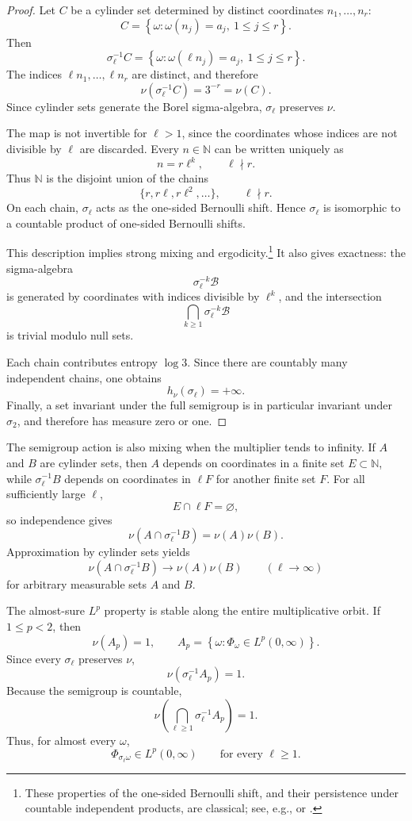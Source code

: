 \documentclass[11pt]{article}
\theoremstyle{remark}
\begin{document}
\begin{proof}
Let \(C\) be a cylinder set determined by distinct coordinates
\(n_1,\dots,n_r\):
\[
C=
\left\{
\omega:
\omega(n_j)=a_j,\ 1\leq j\leq r
\right\}.
\]
Then
\[
\sigma_\ell^{-1}C
=
\left\{
\omega:
\omega(\ell n_j)=a_j,\ 1\leq j\leq r
\right\}.
\]
The indices \(\ell n_1,\dots,\ell n_r\) are distinct, and therefore
\[
\nu(\sigma_\ell^{-1}C)=3^{-r}=\nu(C).
\]
Since cylinder sets generate the Borel sigma-algebra,
\(\sigma_\ell\) preserves \(\nu\).

The map is not invertible for \(\ell>1\), since the coordinates whose
indices are not divisible by \(\ell\) are discarded.  Every
\(n\in\mathbb N\) can be written uniquely as
\[
n=r\ell^k,
\qquad \ell\nmid r.
\]
Thus \(\mathbb N\) is the disjoint union of the chains
\[
\{r,r\ell,r\ell^2,\ldots\},
\qquad \ell\nmid r.
\]
On each chain, \(\sigma_\ell\) acts as the one-sided Bernoulli shift.
Hence \(\sigma_\ell\) is isomorphic to a countable product of
one-sided Bernoulli shifts.

This description implies strong mixing and ergodicity.\footnote{These
properties of the one-sided Bernoulli shift, and their persistence
under countable independent products, are classical; see, e.g.,
\cite{CFS} or \cite{Walters}.} It also gives
exactness: the sigma-algebra
\[
\sigma_\ell^{-k}\mathcal B
\]
is generated by coordinates with indices divisible by \(\ell^k\), and
the intersection
\[
\bigcap_{k\geq1}\sigma_\ell^{-k}\mathcal B
\]
is trivial modulo null sets.

Each chain contributes entropy \(\log 3\).  Since there are countably
many independent chains, one obtains
\[
h_\nu(\sigma_\ell)=+\infty.
\]
Finally, a set invariant under the full semigroup is in particular
invariant under \(\sigma_2\), and therefore has measure zero or one.
\end{proof}

The semigroup action is also mixing when the multiplier tends to
infinity.  If \(A\) and \(B\) are cylinder sets, then \(A\) depends on
coordinates in a finite set \(E\subset\mathbb N\), while
\(\sigma_\ell^{-1}B\) depends on coordinates in \(\ell F\) for another
finite set \(F\).  For all sufficiently large \(\ell\),
\[
E\cap \ell F=\varnothing,
\]
so independence gives
\[
\nu(A\cap\sigma_\ell^{-1}B)=\nu(A)\nu(B).
\]
Approximation by cylinder sets yields
\[
\nu(A\cap\sigma_\ell^{-1}B)
\longrightarrow
\nu(A)\nu(B)
\qquad(\ell\to\infty)
\]
for arbitrary measurable sets \(A\) and \(B\).

The almost-sure \(L^p\) property is stable along the entire
multiplicative orbit.  If \(1\leq p<2\), then
\[
\nu(A_p)=1,
\qquad
A_p=
\left\{
\omega:
\Phi_\omega\in L^p(0,\infty)
\right\}.
\]
Since every \(\sigma_\ell\) preserves \(\nu\),
\[
\nu(\sigma_\ell^{-1}A_p)=1.
\]
Because the semigroup is countable,
\[
\nu\left(
\bigcap_{\ell\geq1}\sigma_\ell^{-1}A_p
\right)=1.
\]
Thus, for almost every \(\omega\),
\[
\Phi_{\sigma_\ell\omega}\in L^p(0,\infty)
\qquad\text{for every }\ell\geq1.
\]
\end{document}
